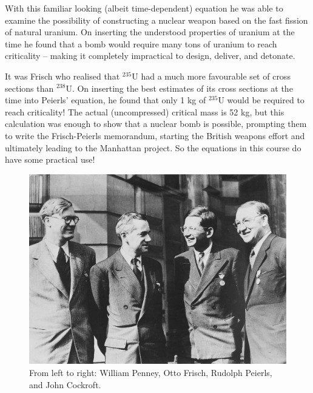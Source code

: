 \documentclass{article}
\begin{document}
With this familiar looking (albeit time-dependent) equation he was able to examine the possibility of constructing a nuclear weapon based on the fast fission of natural uranium. On inserting the understood properties of uranium at the time he found that a bomb would require many tons of uranium to reach criticality -- making it completely impractical to design, deliver, and detonate.

It was Frisch who realised that $^{235}$U had a much more favourable set of cross sections than $^{238}$U. On inserting the best estimates of its cross sections at the time into Peierls' equation, he found that only 1 kg of $^{235}$U would be required to reach criticality! The actual (uncompressed) critical mass is 52 kg, but this calculation was enough to show that a nuclear bomb is possible, prompting them to write the Frisch-Peierls memorandum, starting the British weapons effort and ultimately leading to the Manhattan project. So the equations in this course do have some practical use!

\begin{figure}[h]
    \centering
    \includegraphics[width=0.6\linewidth]{physicists.jpg}
    \caption{From left to right: William Penney, Otto Frisch, Rudolph Peierls, and John Cockroft.}
    \label{fig:frisch}
\end{figure}
\end{document}
